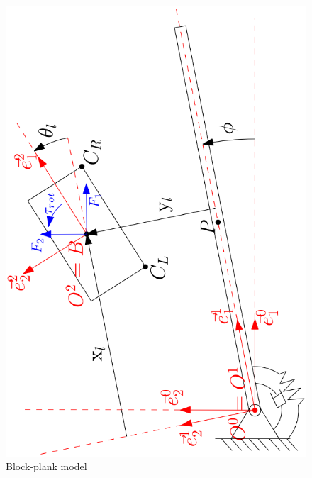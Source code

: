 \documentclass[../DC2017114Bouma.tex]{subfiles}
\begin{document}
\begin{figure}[h]
\centering
\includegraphics[width=.6\textwidth,angle=-90]{blockplankmodel.PNG}\caption{Block-plank model}\label{fig:blockplank}
\end{figure}
\end{document}
